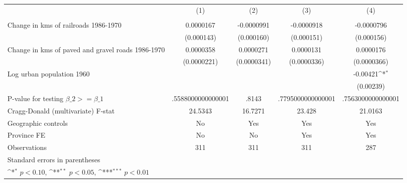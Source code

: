 {
\def\sym#1{\ifmmode^{#1}\else\(^{#1}\)\fi}
\begin{tabular}{l*{4}{c}}
\hline\hline
                &\multicolumn{1}{c}{(1)}&\multicolumn{1}{c}{(2)}&\multicolumn{1}{c}{(3)}&\multicolumn{1}{c}{(4)}\\
                &\multicolumn{1}{c}{}&\multicolumn{1}{c}{}&\multicolumn{1}{c}{}&\multicolumn{1}{c}{}\\
\hline
Change in kms of railroads 1986-1970&0.0000167         &-0.0000991         &-0.0000918         &-0.0000796         \\
                &(0.000143)         &(0.000160)         &(0.000151)         &(0.000156)         \\
[1em]
Change in kms of paved and gravel roads 1986-1970&0.0000358         &0.0000271         &0.0000131         &0.0000176         \\
                &(0.0000221)         &(0.0000341)         &(0.0000336)         &(0.0000366)         \\
[1em]
Log urban population 1960&                  &                  &                  & -0.00421\sym{*}  \\
                &                  &                  &                  &(0.00239)         \\
\hline
P-value for testing $\beta\_{2} >= \beta\_{1}$&.5588000000000001         &    .8143         &.7795000000000001         &.7563000000000001         \\
Cragg-Donald (multivariate) F-stat&  24.5343         &  16.7271         &   23.428         &  21.0163         \\
Geographic controls&       No         &      Yes         &      Yes         &      Yes         \\
Province FE     &       No         &       No         &      Yes         &      Yes         \\
Observations    &      311         &      311         &      311         &      287         \\
\hline\hline
\multicolumn{5}{l}{\footnotesize Standard errors in parentheses}\\
\multicolumn{5}{l}{\footnotesize \sym{*} \(p<0.10\), \sym{**} \(p<0.05\), \sym{***} \(p<0.01\)}\\
\end{tabular}
}
